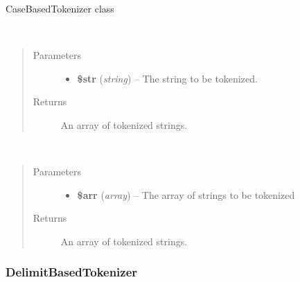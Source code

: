 \documentclass[letterpaper,10pt,english]{sphinxmanual}
\begin{document}
\begin{fulllineitems}
CaseBasedTokenizer class

\begin{fulllineitems}
~\begin{quote}\begin{description}
\item[{Parameters}] \leavevmode\begin{itemize}
\item {} 
\textbf{\$str} (\emph{string}) -- The string to be tokenized.

\end{itemize}

\item[{Returns}] \leavevmode
An array of tokenized strings.

\end{description}\end{quote}

\end{fulllineitems}


\begin{fulllineitems}
~\begin{quote}\begin{description}
\item[{Parameters}] \leavevmode\begin{itemize}
\item {} 
\textbf{\$arr} (\emph{array}) -- The array of strings to be tokenized

\end{itemize}

\item[{Returns}] \leavevmode
An array of tokenized strings.

\end{description}\end{quote}

\end{fulllineitems}


\end{fulllineitems}



\subsubsection{DelimitBasedTokenizer}
\label{docs/api:delimitbasedtokenizer}
\end{document}
